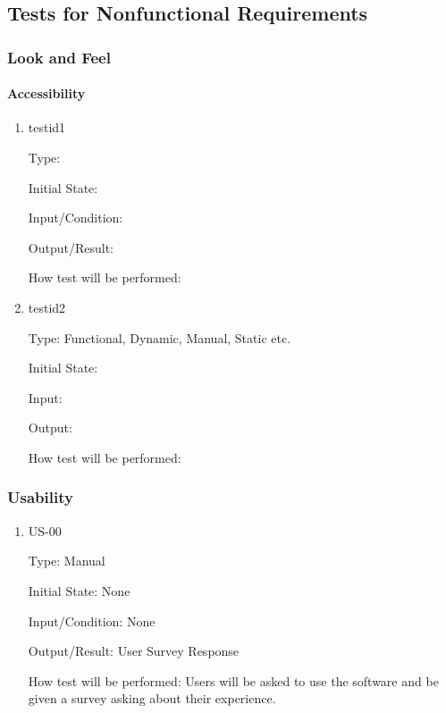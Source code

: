 \documentclass[12pt, titlepage]{article}
\begin{document}
\subsection{Tests for Nonfunctional Requirements}

\subsubsection{Look and Feel}
		
\paragraph{Accessibility}

\begin{enumerate}

\item{testid1\\}

Type: 
					
Initial State: 
					
Input/Condition: 
					
Output/Result: 
					
How test will be performed: 
		
\item{testid2\\}

Type: Functional, Dynamic, Manual, Static etc.
					
Initial State: 
					
Input: 
					
Output: 
					
How test will be performed: 

\end{enumerate}

\subsubsection{Usability}

\begin{enumerate}

\item{US-00\\}

Type: Manual
					
Initial State: None
					
Input/Condition: None
					
Output/Result: User Survey Response
					
How test will be performed: Users will be asked to use the software and be given a survey asking about their experience. 

\end{enumerate}
\end{document}
